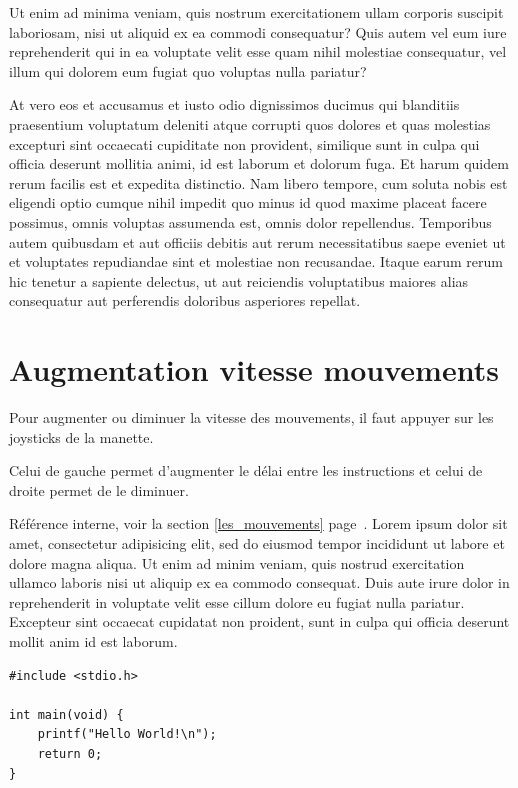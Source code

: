 Ut enim ad minima veniam, quis nostrum exercitationem ullam corporis suscipit laboriosam, nisi ut aliquid ex ea commodi consequatur? Quis autem vel eum iure reprehenderit qui in ea voluptate velit esse quam nihil molestiae consequatur, vel illum qui dolorem eum fugiat quo voluptas nulla pariatur?

At vero eos et accusamus et iusto odio dignissimos ducimus qui blanditiis praesentium voluptatum deleniti atque corrupti quos dolores et quas molestias excepturi sint occaecati cupiditate non provident, similique sunt in culpa qui officia deserunt mollitia animi, id est laborum et dolorum fuga. Et harum quidem rerum facilis est et expedita distinctio. Nam libero tempore, cum soluta nobis est eligendi optio cumque nihil impedit quo minus id quod maxime placeat facere possimus, omnis voluptas assumenda est, omnis dolor repellendus. Temporibus autem quibusdam et aut officiis debitis aut rerum necessitatibus saepe eveniet ut et voluptates repudiandae sint et molestiae non recusandae. Itaque earum rerum hic tenetur a sapiente delectus, ut aut reiciendis voluptatibus maiores alias consequatur aut perferendis doloribus asperiores repellat.
		
		\section{Augmentation vitesse mouvements}

Pour augmenter ou diminuer la vitesse des mouvements, il faut appuyer sur les joysticks de la manette.

Celui de gauche permet d'augmenter le délai entre les instructions et celui de droite permet de le diminuer.
		
Référence interne, voir la section \ref{les_mouvements} page~\pageref{les_mouvements}. %
Lorem ipsum dolor sit amet, consectetur adipisicing elit, sed do eiusmod tempor incididunt ut labore et dolore magna aliqua. Ut enim ad minim veniam, quis nostrud exercitation ullamco laboris nisi ut aliquip ex ea commodo consequat. Duis aute irure dolor in reprehenderit in voluptate velit esse cillum dolore eu fugiat nulla pariatur. Excepteur sint occaecat cupidatat non proident, sunt in culpa qui officia deserunt mollit anim id est laborum.

\begin{lstlisting}[style=sourceC]
#include <stdio.h>

int main(void) {
	printf("Hello World!\n");
	return 0;
}
\end{lstlisting}		

